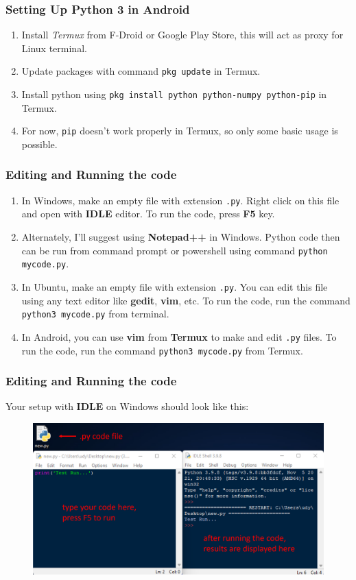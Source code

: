 \documentclass{beamer}
\begin{document}
\begin{frame}
\frametitle{Setting Up Python 3 in Android}
\begin{enumerate}
\item Install \emph{Termux} from F-Droid or Google Play Store, this will act as proxy for Linux terminal.
\item Update packages with command \lstinline{pkg update} in Termux.
\item Install python using \lstinline{pkg install python python-numpy python-pip} in Termux.
\item For now, \lstinline{pip} doesn't work properly in Termux, so only some basic usage is possible.
\end{enumerate}
\end{frame}

\begin{frame}
\frametitle{Editing and Running the code}
\begin{enumerate}
\item In Windows, make an empty file with extension \lstinline{.py}. Right click on this file and open with \textbf{IDLE} editor. To run the code, press \textbf{F5} key.
\item Alternately, I'll suggest using \textbf{Notepad++} in Windows. Python code then can be run from command prompt or powershell using command \lstinline{python mycode.py}.
\item In Ubuntu, make an empty file with extension \lstinline{.py}. You can edit this file using any text editor like \textbf{gedit}, \textbf{vim}, etc. To run the code, run the command \lstinline{python3 mycode.py} from terminal.
\item In Android, you can use \textbf{vim} from \textbf{Termux} to make and edit \lstinline{.py} files. To run the code, run the command \lstinline{python3 mycode.py} from Termux.
\end{enumerate}
\end{frame}

\begin{frame}
\frametitle{Editing and Running the code}
Your setup with \textbf{IDLE} on Windows should look like this:
\begin{figure}[H]
\centering
\includegraphics[width=\textwidth]{images/0_windows-idle.png}
\end{figure}
\end{frame}
\end{document}

